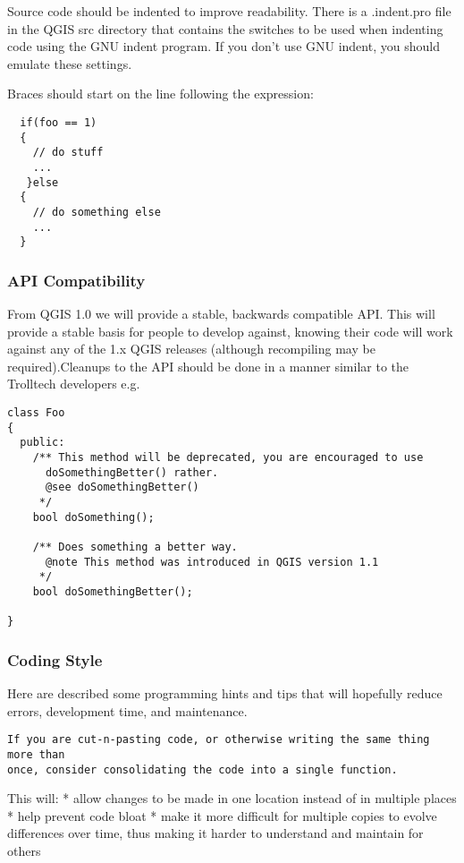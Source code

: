 Source code should be indented to improve readability. There is a .indent.pro
file in the QGIS src directory that contains the switches to be used when
indenting code using the GNU indent program. If you don't use GNU indent, you
should emulate these settings.

Braces should start on the line following the expression:

\begin{verbatim}
  if(foo == 1)
  {
    // do stuff
    ...
   }else
  {
    // do something else
    ...
  }
\end{verbatim}

\subsubsection{API Compatibility}
From QGIS 1.0 we will provide a stable, backwards compatible API. This will
provide a stable basis for people to develop against, knowing their code will
work against any of the 1.x QGIS releases (although recompiling may be
required).Cleanups to the API should be done in a manner similar to the
Trolltech developers e.g.

\begin{verbatim}
class Foo 
{
  public:
    /** This method will be deprecated, you are encouraged to use 
      doSomethingBetter() rather.
      @see doSomethingBetter()
     */
    bool doSomething();

    /** Does something a better way.
      @note This method was introduced in QGIS version 1.1
     */
    bool doSomethingBetter();

}
\end{verbatim}

\subsubsection{Coding Style}
Here are described some programming hints and tips that will hopefully reduce
errors, development time, and maintenance.

\begin{verbatim}
If you are cut-n-pasting code, or otherwise writing the same thing more than
once, consider consolidating the code into a single function.
\end{verbatim}

This will:
  * allow changes to be made in one location instead of in multiple places
  * help prevent code bloat
  * make it more difficult for multiple copies to evolve differences over time,
    thus making it harder to understand and maintain for others

